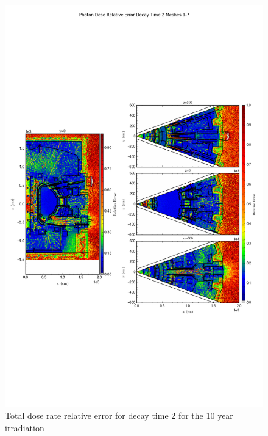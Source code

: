 \documentclass[12pt]{article}
\begin{document}
\begin{figure}[ht!]
\centering
\includegraphics[trim={0cm 8cm, 0cm 8cm},clip,scale=0.75]{../plots/final_model_with_b4c/10year/Photon_Dose_Relative_Error_Decay_Time_2_Meshes_1-7.png}
\caption{Total dose rate relative error for decay time 2 for the 10 year irradiation}
\label{fig:photons_10y_dc2_b4c_relerr}
\end{figure}
\end{document}
